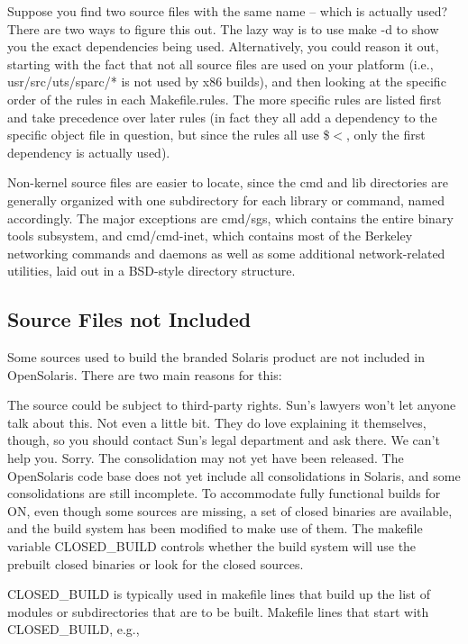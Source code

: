 \documentclass{article}
\begin{document}
\vspace{0.2cm}
Suppose you find two source files with the same name -- which is actually used?
There are two ways to figure this out. The lazy way is to use make -d to show
you the exact dependencies being used. Alternatively, you could reason it out,
starting with the fact that not all source files are used on your platform
(i.e., usr/src/uts/sparc/* is not used by x86 builds), and then looking at the
specific order of the rules in each Makefile.rules. The more specific rules are
listed first and take precedence over later rules (in fact they all add a
dependency to the specific object file in question, but since the rules all use
\$$<$, only the first dependency is actually used).

Non-kernel source files are easier to locate, since the cmd and lib directories
are generally organized with one subdirectory for each library or command,
named accordingly. The major exceptions are cmd/sgs, which contains the entire
binary tools subsystem, and cmd/cmd-inet, which contains most of the Berkeley
networking commands and daemons as well as some additional network-related
utilities, laid out in a BSD-style directory structure.

\subsection*{Source Files not Included}

Some sources used to build the branded Solaris product are not included in
OpenSolaris. There are two main reasons for this:

The source could be subject to third-party rights. Sun's lawyers won't let
anyone talk about this. Not even a little bit. They do love explaining it
themselves, though, so you should contact Sun's legal department and ask
there. We can't help you. Sorry. The consolidation may not yet have been
released. The OpenSolaris code base does not yet include all consolidations in
Solaris, and some consolidations are still incomplete. To accommodate fully
functional builds for ON, even though some sources are missing, a set of closed
binaries are available, and the build system has been modified to make use of
them. The makefile variable CLOSED\_BUILD controls whether the build system will
use the prebuilt closed binaries or look for the closed sources.

CLOSED\_BUILD is typically used in makefile lines that build up the list of
modules or subdirectories that are to be built. Makefile lines that start with
CLOSED\_BUILD, e.g.,
\end{document}
